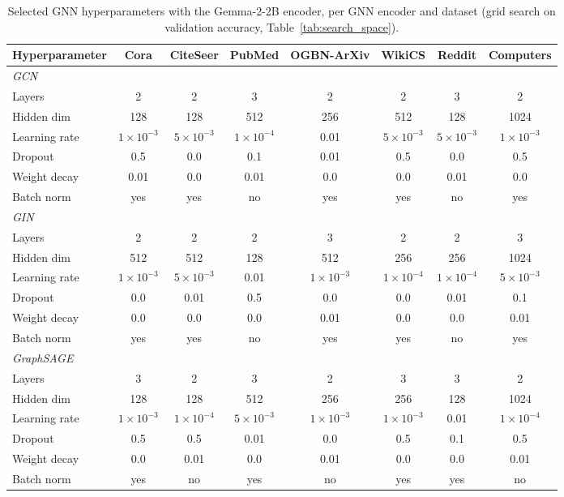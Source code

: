 \documentclass[a4paper,fleqn]{cas-sc}
\begin{document}
\begin{table}[htbp]
\centering\color{red}
\caption{Selected GNN hyperparameters with the Gemma-2-2B encoder, per GNN encoder and dataset (grid search on validation accuracy, Table~\ref{tab:search_space}).}
\label{tab:gnn_hp_gemma}
\footnotesize
\setlength{\tabcolsep}{3pt}
\begin{tabular*}{\textwidth}{@{\extracolsep{\fill}} lccccccc @{}}
\toprule
\textbf{Hyperparameter} & \textbf{Cora} & \textbf{CiteSeer} & \textbf{PubMed} & \textbf{OGBN-ArXiv} & \textbf{WikiCS} & \textbf{Reddit} & \textbf{Computers} \\
\midrule
\multicolumn{8}{l}{\textit{GCN}} \\
\midrule
Layers & 2 & 2 & 3 & 2 & 2 & 3 & 2 \\
Hidden dim & 128 & 128 & 512 & 256 & 512 & 128 & 1024 \\
Learning rate & $1\times10^{-3}$ & $5\times10^{-3}$ & $1\times10^{-4}$ & 0.01 & $5\times10^{-3}$ & $5\times10^{-3}$ & $1\times10^{-3}$ \\
Dropout & 0.5 & 0.0 & 0.1 & 0.01 & 0.5 & 0.0 & 0.5 \\
Weight decay & 0.01 & 0.0 & 0.01 & 0.0 & 0.0 & 0.01 & 0.0 \\
Batch norm & yes & yes & no & yes & yes & no & yes \\
\midrule
\multicolumn{8}{l}{\textit{GIN}} \\
\midrule
Layers & 2 & 2 & 2 & 3 & 2 & 2 & 3 \\
Hidden dim & 512 & 512 & 128 & 512 & 256 & 256 & 1024 \\
Learning rate & $1\times10^{-3}$ & $5\times10^{-3}$ & 0.01 & $1\times10^{-3}$ & $1\times10^{-4}$ & $1\times10^{-4}$ & $5\times10^{-3}$ \\
Dropout & 0.0 & 0.01 & 0.5 & 0.0 & 0.0 & 0.01 & 0.1 \\
Weight decay & 0.0 & 0.0 & 0.0 & 0.01 & 0.0 & 0.0 & 0.01 \\
Batch norm & yes & yes & no & yes & yes & no & yes \\
\midrule
\multicolumn{8}{l}{\textit{GraphSAGE}} \\
\midrule
Layers & 3 & 2 & 3 & 2 & 3 & 3 & 2 \\
Hidden dim & 128 & 128 & 512 & 256 & 256 & 128 & 1024 \\
Learning rate & $1\times10^{-3}$ & $1\times10^{-4}$ & $5\times10^{-3}$ & $1\times10^{-3}$ & $1\times10^{-3}$ & 0.01 & $1\times10^{-4}$ \\
Dropout & 0.5 & 0.5 & 0.01 & 0.0 & 0.5 & 0.1 & 0.5 \\
Weight decay & 0.0 & 0.01 & 0.0 & 0.01 & 0.0 & 0.0 & 0.01 \\
Batch norm & yes & no & yes & no & yes & yes & no \\
\bottomrule
\end{tabular*}
\end{table}
\end{document}
